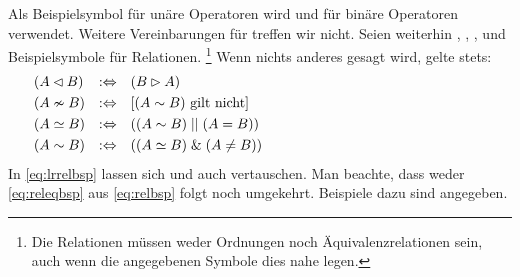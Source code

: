 Als Beispielsymbol für unäre Operatoren wird \chrqt{$\opubsp$} und für binäre Operatoren \chrqt{$\opbsp$} verwendet.
Weitere Vereinbarungen für \chrqt{$\opubsp$} treffen wir nicht.
Seien weiterhin , , ,  und  Beispielsymbole für Relationen.%
\footnote{%
	Die Relationen müssen weder Ordnungen noch Äquivalenzrelationen sein, auch wenn die angegebenen Symbole dies nahe legen.
}
Wenn nichts anderes gesagt wird, gelte stets:
%
\begin{align}
	& (A \lhd   B) & :\Leftrightarrow & \quad  (B \rhd   A)
	\label{eq:lrrelbsp}   \\
	& (A \nsim  B)  & :\Leftrightarrow & \quad [(A \sim   B) \text{ gilt nicht}]
	\label{eq:relnbsp}    \\
	& (A \simeq  B) & :\Leftrightarrow & \quad ((A \sim   B) \;||\;  (A = B))
	\label{eq:releqbsp}   \\
	& (A \sim B)    & :\Leftrightarrow & \quad ((A \simeq B) \;\&\; (A \ne B))
	\label{eq:relbsp}    &&&&&&&&&&&&&&&&&&&&&&&&&&&&&&
\end{align}
%
In \eqref{eq:lrrelbsp} lassen sich \chrqt{$\lrelbsp$} und \chrqt{$\rrelbsp$} auch vertauschen.
Man beachte, dass weder \eqref{eq:releqbsp} aus \eqref{eq:relbsp} folgt noch umgekehrt.
Beispiele dazu sind  angegeben.

